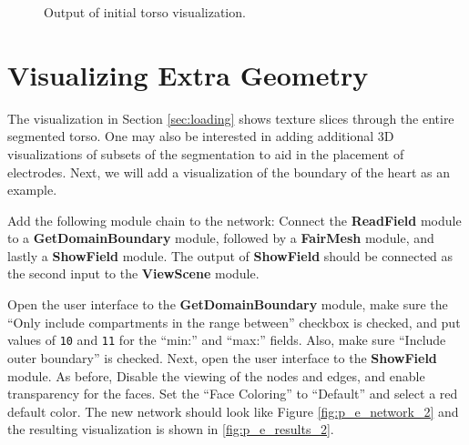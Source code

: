 \documentclass[fleqn,11pt,openany]{book}
\begin{document}
\begin{figure}
\caption{Output of initial torso
visualization.}\label{fig:p_e_results_1}
\end{figure}

\section{Visualizing Extra Geometry}

The visualization in Section \ref{sec:loading} shows texture slices
through the entire segmented torso. One may also be interested in
adding additional 3D visualizations of subsets of the segmentation to
aid in the placement of electrodes. Next, we will add a visualization
of the boundary of the heart as an example.

Add the following module chain to the network: Connect the {\bf
ReadField} module to a {\bf GetDomainBoundary} module, followed by a
{\bf FairMesh} module, and lastly a {\bf ShowField} module. The output
of {\bf ShowField} should be connected as the second input to the {\bf
ViewScene} module.

Open the user interface to the {\bf GetDomainBoundary} module, make
sure the ``Only include compartments in the range between'' checkbox
is checked, and put values of {\tt 10} and {\tt 11} for the ``min:''
and ``max:'' fields. Also, make sure ``Include outer boundary'' is
checked. Next, open the user interface to the {\bf ShowField}
module. As before, Disable the viewing of the nodes and edges, and
enable transparency for the faces. Set the ``Face Coloring'' to
``Default'' and select a red default color. The new network should
look like Figure \ref{fig:p_e_network_2} and the resulting
visualization is shown in \ref{fig:p_e_results_2}.
\end{document}
